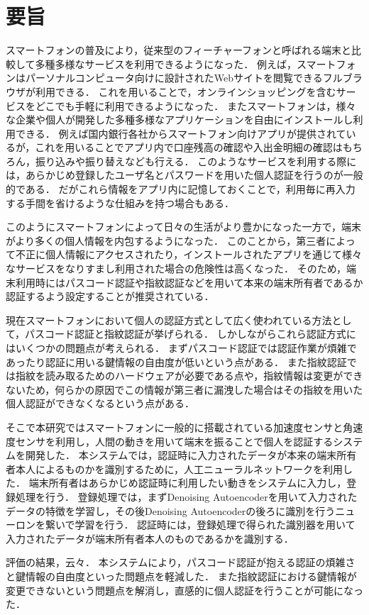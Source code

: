 \chapter*{要旨}
スマートフォンの普及により，従来型のフィーチャーフォンと呼ばれる端末と比較して多種多様なサービスを利用できるようになった．
例えば，スマートフォンはパーソナルコンピュータ向けに設計されたWebサイトを閲覧できるフルブラウザが利用できる．
これを用いることで，オンラインショッピングを含むサービスをどこでも手軽に利用できるようになった．
またスマートフォンは，様々な企業や個人が開発した多種多様なアプリケーションを自由にインストールし利用できる．
例えば国内銀行各社からスマートフォン向けアプリが提供されているが，これを用いることでアプリ内で口座残高の確認や入出金明細の確認はもちろん，振り込みや振り替えなども行える．
このようなサービスを利用する際には，あらかじめ登録したユーザ名とパスワードを用いた個人認証を行うのが一般的である．
だがこれら情報をアプリ内に記憶しておくことで，利用毎に再入力する手間を省けるような仕組みを持つ場合もある．

このようにスマートフォンによって日々の生活がより豊かになった一方で，端末がより多くの個人情報を内包するようになった．
このことから，第三者によって不正に個人情報にアクセスされたり，インストールされたアプリを通じて様々なサービスをなりすまし利用された場合の危険性は高くなった．
そのため，端末利用時にはパスコード認証や指紋認証などを用いて本来の端末所有者であるか認証するよう設定することが推奨されている．

現在スマートフォンにおいて個人の認証方式として広く使われている方法として，パスコード認証と指紋認証が挙げられる．
しかしながらこれら認証方式にはいくつかの問題点が考えられる．
まずパスコード認証では認証作業が煩雑であったり認証に用いる鍵情報の自由度が低いという点がある．
また指紋認証では指紋を読み取るためのハードウェアが必要である点や，指紋情報は変更ができないため，何らかの原因でこの情報が第三者に漏洩した場合はその指紋を用いた個人認証ができなくなるという点がある．

そこで本研究ではスマートフォンに一般的に搭載されている加速度センサと角速度センサを利用し，人間の動きを用いて端末を振ることで個人を認証するシステムを開発した．
本システムでは，認証時に入力されたデータが本来の端末所有者本人によるものかを識別するために，人工ニューラルネットワークを利用した．
端末所有者はあらかじめ認証時に利用したい動きをシステムに入力し，登録処理を行う．
登録処理では，まずDenoising Autoencoderを用いて入力されたデータの特徴を学習し，その後Denoising Autoencoderの後ろに識別を行うニューロンを繋いで学習を行う．
認証時には，登録処理で得られた識別器を用いて入力されたデータが端末所有者本人のものであるかを識別する．

評価の結果，云々．
本システムにより，パスコード認証が抱える認証の煩雑さと鍵情報の自由度といった問題点を軽減した．
また指紋認証における鍵情報が変更できないという問題点を解消し，直感的に個人認証を行うことが可能になった．
